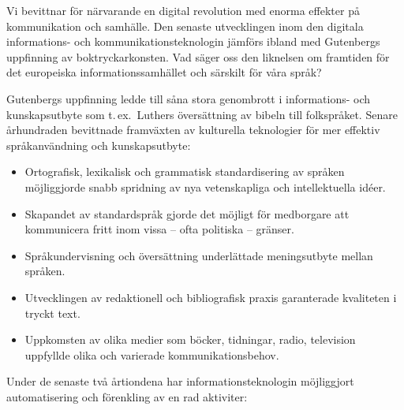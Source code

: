 \begin{multicols}{2}

Vi bevittnar för närvarande en digital revolution med enorma effekter
på kommunikation och samhälle. Den senaste utvecklingen inom den
digitala informations- och kommunika\-tions\-teknologin jämförs ibland
med Gutenbergs uppfinning av bok\-tryckar\-konsten. Vad säger oss den
liknelsen om fram\-tiden för det europeiska informations\-samhället
och särskilt för våra språk?


Gutenbergs uppfinning ledde till såna stora genombrott i informations-
och kunskaps\-utbyte som t.\,ex.~Luthers översättning av bibeln till
folkspråket. Senare århundraden bevittnade framväxten av kulturella
teknologier för mer effektiv språkanvändning och kunskapsutbyte:

\medskip
\begin{itemize}
\item Ortografisk, lexikalisk och grammatisk standardisering av
  språken möjliggjorde snabb spridning av nya vetenskapliga och
  intellektuella idéer.
\item Skapandet av standardspråk gjorde det möjligt för medborgare att
  kommunicera fritt inom vissa -- ofta politiska -- gränser.
\item Språkundervisning och översättning underlättade meningsutbyte
  mellan språken.
\item Utvecklingen av redaktionell och bibliografisk praxis
  garanterade kvaliteten i tryckt text.
\item Uppkomsten av olika medier som böcker, tidningar, radio,
  television uppfyllde olika och varierade kommunikationsbehov.
\end{itemize}

Under de senaste två årtiondena har informations\-teknologin
möjliggjort automatisering och förenkling av en rad aktiviter:


\end{multicols}
